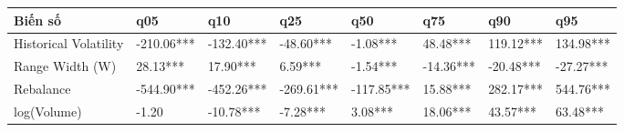 \begin{tabular}{llllllll}
\toprule
Biến số & q05 & q10 & q25 & q50 & q75 & q90 & q95 \\
\midrule
Historical Volatility & -210.06*** & -132.40*** & -48.60*** & -1.08*** & 48.48*** & 119.12*** & 134.98*** \\
Range Width (W) & 28.13*** & 17.90*** & 6.59*** & -1.54*** & -14.36*** & -20.48*** & -27.27*** \\
Rebalance & -544.90*** & -452.26*** & -269.61*** & -117.85*** & 15.88*** & 282.17*** & 544.76*** \\
log(Volume) & -1.20 & -10.78*** & -7.28*** & 3.08*** & 18.06*** & 43.57*** & 63.48*** \\
\bottomrule
\end{tabular}
